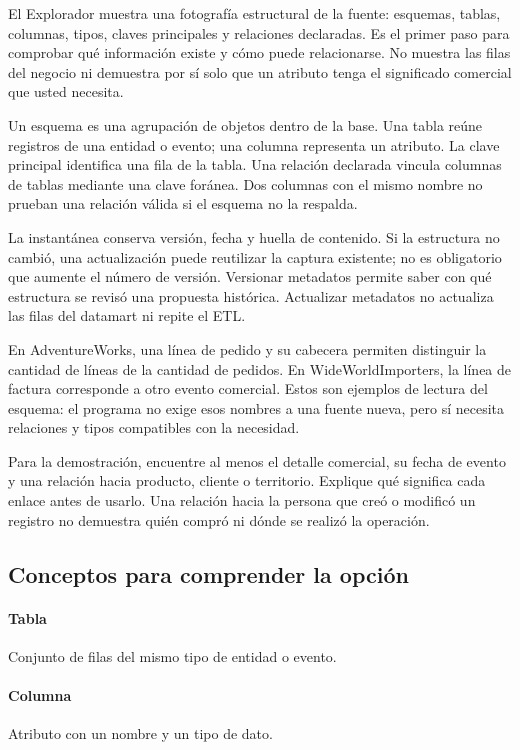 El Explorador muestra una fotografía estructural de la fuente: esquemas, tablas, columnas, tipos, claves principales y relaciones declaradas. Es el primer paso para comprobar qué información existe y cómo puede relacionarse. No muestra las filas del negocio ni demuestra por sí solo que un atributo tenga el significado comercial que usted necesita.

Un esquema es una agrupación de objetos dentro de la base. Una tabla reúne registros de una entidad o evento; una columna representa un atributo. La clave principal identifica una fila de la tabla. Una relación declarada vincula columnas de tablas mediante una clave foránea. Dos columnas con el mismo nombre no prueban una relación válida si el esquema no la respalda.

La instantánea conserva versión, fecha y huella de contenido. Si la estructura no cambió, una actualización puede reutilizar la captura existente; no es obligatorio que aumente el número de versión. Versionar metadatos permite saber con qué estructura se revisó una propuesta histórica. Actualizar metadatos no actualiza las filas del datamart ni repite el ETL.

En AdventureWorks, una línea de pedido y su cabecera permiten distinguir la cantidad de líneas de la cantidad de pedidos. En WideWorldImporters, la línea de factura corresponde a otro evento comercial. Estos son ejemplos de lectura del esquema: el programa no exige esos nombres a una fuente nueva, pero sí necesita relaciones y tipos compatibles con la necesidad.

Para la demostración, encuentre al menos el detalle comercial, su fecha de evento y una relación hacia producto, cliente o territorio. Explique qué significa cada enlace antes de usarlo. Una relación hacia la persona que creó o modificó un registro no demuestra quién compró ni dónde se realizó la operación.

\subsection{Conceptos para comprender la opción}
\paragraph{Tabla} Conjunto de filas del mismo tipo de entidad o evento.

\paragraph{Columna} Atributo con un nombre y un tipo de dato.


